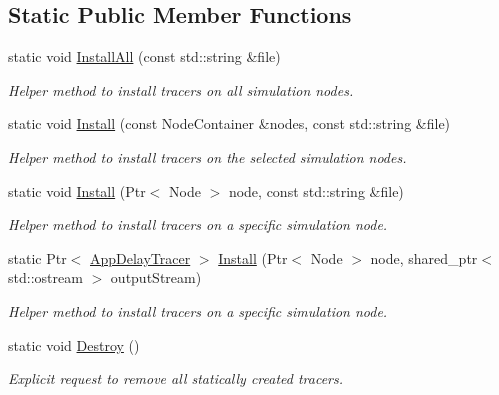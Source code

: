 \subsection*{Static Public Member Functions}
\begin{DoxyCompactItemize}
\item 
static void \hyperlink{classns3_1_1ndn_1_1AppDelayTracer_a1fe7d0148795fd68668d4667288b8996}{Install\+All} (const std\+::string \&file)
\begin{DoxyCompactList}\small\item\em Helper method to install tracers on all simulation nodes. \end{DoxyCompactList}\item 
static void \hyperlink{classns3_1_1ndn_1_1AppDelayTracer_aac9f5405fc413adfe56703acca357df9}{Install} (const Node\+Container \&nodes, const std\+::string \&file)
\begin{DoxyCompactList}\small\item\em Helper method to install tracers on the selected simulation nodes. \end{DoxyCompactList}\item 
static void \hyperlink{classns3_1_1ndn_1_1AppDelayTracer_a1f37e4055e9675f9fb3f2e899986c8de}{Install} (Ptr$<$ Node $>$ node, const std\+::string \&file)
\begin{DoxyCompactList}\small\item\em Helper method to install tracers on a specific simulation node. \end{DoxyCompactList}\item 
static Ptr$<$ \hyperlink{classns3_1_1ndn_1_1AppDelayTracer}{App\+Delay\+Tracer} $>$ \hyperlink{classns3_1_1ndn_1_1AppDelayTracer_aaeb0c41324a9c911696e5585c2f2e9a0}{Install} (Ptr$<$ Node $>$ node, shared\+\_\+ptr$<$ std\+::ostream $>$ output\+Stream)
\begin{DoxyCompactList}\small\item\em Helper method to install tracers on a specific simulation node. \end{DoxyCompactList}\item 
static void \hyperlink{classns3_1_1ndn_1_1AppDelayTracer_a3abbc4bf0296057842b59fa1351883c3}{Destroy} ()
\begin{DoxyCompactList}\small\item\em Explicit request to remove all statically created tracers. \end{DoxyCompactList}\end{DoxyCompactItemize}


